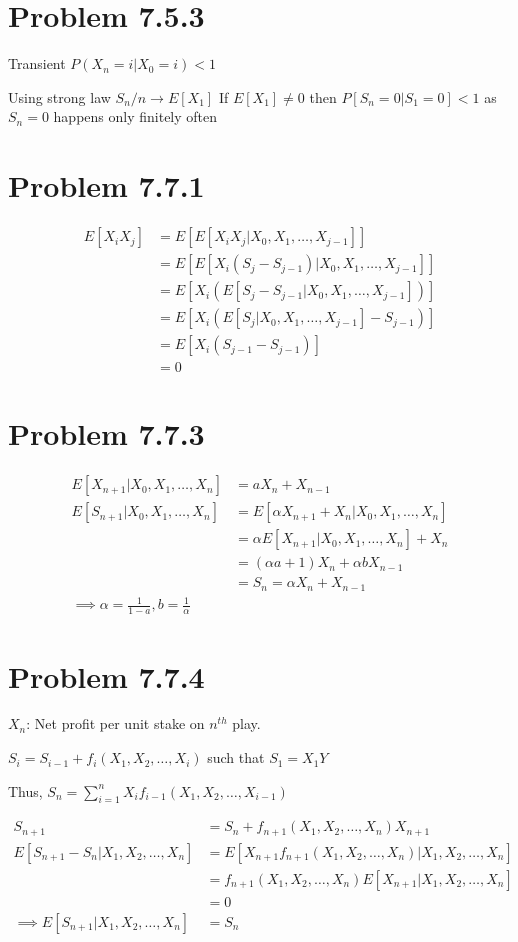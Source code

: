 \documentclass[a4paper]{article}
\begin{document}
\section*{Problem 7.5.3}
Transient $P(X_n=i|X_0=i)< 1$

Using strong law $S_n/n \longrightarrow E[X_1]$ If $E[X_1]\neq 0$ then $P[S_n=0|S_1=0] < 1$ as $S_n=0$ happens only finitely often

\section*{Problem 7.7.1}
\begin{align*}
E[X_iX_j] &= E[E[X_iX_j|X_0,X_1,\dots, X_{j-1}]]\\
&= E[E[X_i(S_j-S_{j-1})|X_0,X_1,\dots,X_{j-1}]]\\
&= E[X_i(E[S_j-S_{j-1}|X_0,X_1,\dots,X_{j-1}])]\\
&= E[X_i(E[S_j|X_0,X_1,\dots,X_{j-1}]-S_{j-1})]\\
&= E[X_i(S_{j-1}-S_{j-1})]\\
&=0
\end{align*}

\section*{Problem 7.7.3}
\begin{align*}
E[X_{n+1}|X_0,X_1,\dots,X_n] &= aX_n+X_{n-1} \\
E[S_{n+1}|X_0,X_1,\dots, X_n] &= E[\alpha X_{n+1}+X_{n}|X_0,X_1,\dots,X_n]\\
&= \alpha E[X_{n+1}|X_0,X_1,\dots, X_n] + X_n\\
&= (\alpha a+1)X_n + \alpha bX_{n-1}\\
&= S_n = \alpha X_n+X_{n-1}\\
\implies \alpha = \frac{1}{1-a}, b=\frac{1}{\alpha}
\end{align*}

\section*{Problem 7.7.4}
$X_n$: Net profit per unit stake on $n^{th}$ play.

$S_{i} = S_{i-1}+f_{i}(X_1,X_2,\dots,X_i)$ 
such that $S_1=X_1Y$

Thus, $S_{n} = \sum_{i=1}^n X_if_{i-1}(X_1,X_2,\dots, X_{i-1})$

\begin{align*}
S_{n+1} &=  S_n + f_{n+1}(X_1,X_2,\dots, X_n)X_{n+1}\\
E[S_{n+1}-S_n|X_1,X_2,\dots,X_n] &= E[X_{n+1}f_{n+1}(X_1,X_2,\dots, X_n)|X_1,X_2,\dots,X_n]\\ 
&= f_{n+1}(X_1,X_2,\dots, X_n)E[X_{n+1}|X_1,X_2,\dots,X_n]\\
&= 0\\
\implies E[S_{n+1}|X_1,X_2,\dots,X_n] &= S_n
\end{align*}
\end{document}
